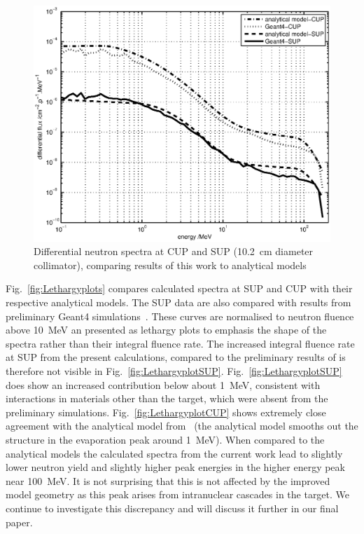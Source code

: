 \documentclass[peerreviewca,11pt,a4paper]{IEEEtran}
\let\MYoriglatexcaption\caption
\renewcommand{\caption}[2][\relax]{\MYoriglatexcaption[#2]{#2}}
\begin{document}
\begin{figure}[!t]
    \centering
    \includegraphics[width=0.8\columnwidth]{DiffYieldComparedSUPCUP10.eps}
    \caption{
        Differential neutron spectra at CUP and SUP (\SI{10.2}{\cm} diameter collimator), comparing results of this work to analytical models~\cite{Prokofiev2009,Prokofiev2014}
    }
    \label{fig:DifferentialSpectra}
\end{figure}

Fig.~\ref{fig:Lethargyplots} compares calculated spectra at SUP and CUP with their respective analytical models.
The SUP data are also compared with results from preliminary Geant4 simulations~\cite{Platt2013}.
These curves are normalised to neutron fluence above \SI{10}{\MeV} an presented as lethargy plots to emphasis the shape of the spectra rather than their integral fluence rate.
The increased integral fluence rate at SUP from the present calculations, compared to the preliminary results of \cite{Platt2013} is therefore not visible in Fig.~\ref{fig:LethargyplotSUP}.
Fig.~\ref{fig:LethargyplotSUP} does show an increased contribution below about \SI{1}{\MeV}, consistent with interactions in materials other than the target, which were absent from the preliminary simulations.
Fig.~\ref{fig:LethargyplotCUP} shows extremely close agreement with the analytical model from~\cite{Prokofiev2014} (the analytical model smooths out the structure in the evaporation peak around \SI{1}{\MeV}).
When compared to the analytical models the calculated spectra from the current work lead to slightly lower neutron yield and slightly higher peak energies in the higher energy peak near \SI{100}{\MeV}.
It is not surprising that this is not affected by the improved model geometry as this peak arises from intranuclear cascades in the target.
We continue to investigate this discrepancy and will discuss it further in our final paper.
\end{document}
